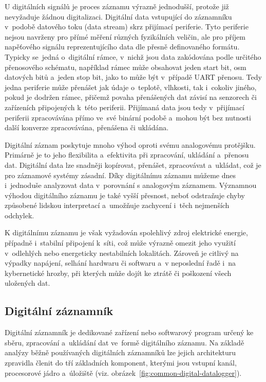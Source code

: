U digitálních signálů je proces záznamu výrazně jednodušší, protože již nevyžaduje žádnou digitalizaci. Digitální data vstupující do záznamníku v~podobě datového toku (data stream) skrz přijímací periferie. Tyto periferie nejsou navrženy pro přímé měření různých fyzikálních veličin, ale pro příjem napěťového signálu reprezentujícího data dle přesně definovaného formátu. Typicky se~jedná o~digitální rámce, v~nichž jsou data zakódována podle určitého přenosového schématu, například rámec může obsahovat jeden start bit, osm datových bitů a~jeden stop bit, jako to může být v~případě UART přenosu. Tedy jedna periferie může přenášet jak údaje o~teplotě, vlhkosti, tak i~cokoliv jiného, pokud je dodržen rámec, přičemž povaha přenášených dat závisí na senzorech či zařízeních připojených k~této periferii. Přijímaná data jsou tedy v~přijímací periferii zpracovávána přímo ve~své binární podobě a~mohou být bez nutnosti další konverze zpracovávána, přenášena či ukládána.

Digitální záznam poskytuje mnoho výhod oproti svému analogovému protějšku. Primárně je to jeho flexibilita a~efektivita při zpracování, ukládání a~přenosu dat. Digitální data lze snadněji kopírovat, přenášet, zpracovávat a~ukládat, což je pro záznamové systémy zásadní. Díky digitálnímu záznamu můžeme dnes i~jednoduše analyzovat data v~porovnání s analogovým záznamem.  Významnou výhodou digitálního záznamu je také vyšší přesnost, neboť odstraňuje chyby způsobené lidskou interpretací a~umožňuje zachycení i~těch nejmenších odchylek.~\cite{rcp_analog_vs_digital}

K digitálnímu záznamu je však vyžadován spolehlivý zdroj elektrické energie, případně i~stabilní připojení k~síti, což může výrazně omezit jeho využití v~odlehlých nebo energeticky nestabilních lokalitách. Zároveň je citlivý na výpadky napájení, selhání hardwaru či softwaru a~v neposlední řadě i~na kybernetické hrozby, při kterých může dojít ke ztrátě či poškození všech uložených dat.~\cite{rcp_analog_vs_digital}

\subsection{Digitální záznamník}
\label{digitalni_zaznamik}
Digitální záznamník je dedikované zařízení nebo softwarový program určený ke sběru, zpracování a~ukládání dat ve~formě digitálního záznamu. Na základě analýzy běžně používaných digitálních záznamníků lze jejich architekturu zpravidla členit do tří základních komponent, kterými jsou vstupní kanál, procesorové jádro a~úložiště (viz. obrázek~\ref{fig:common-digital-datalogger}).~\cite{researchgate_general_dataloggger_multiple_sdcards, ieee_digital_sound_recorder_arm_sd_card, ieee_multi_connectivity_datalogger_sd_card}

